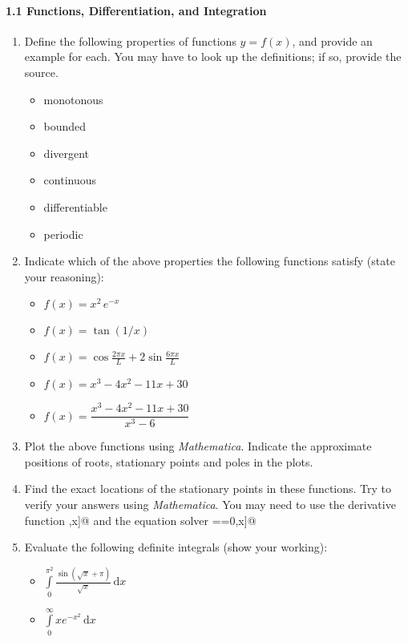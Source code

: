 \documentclass{chem6155problemset}
\begin{document}
\paragraph{1.1 Functions, Differentiation, and Integration}
\begin{enumerate}
 	\item Define the following properties of functions $y=f(x)$, and provide an example for each. You
	may have to look up the definitions; if so, provide the source.
	  \begin{itemize}
	  	\item monotonous
		\item bounded
		\item divergent
		\item continuous
		\item differentiable
		\item periodic
	  \end{itemize}
	  
	 \item Indicate which of the above properties the following functions satisfy (state
	 your reasoning):
	 	\begin{itemize}
			\item $f(x)=x^2\,e^{-x}$
			\item $f(x)=\tan(1/x)$
			\item $f(x)=\cos\frac{2\pi x}{L} + 2 \sin\frac{6\pi x}{L}$
			\item $f(x) = x^3-4x^2-11x+30$
			\item $f(x) = \dfrac{x^3-4x^2-11x+30}{x^3-6}$
		\end{itemize}
		
	\item Plot the above functions using \emph{Mathematica}. Indicate the approximate 
	positions of roots, stationary points and poles in the plots.
	
	\item Find the exact locations of the stationary points in these functions. 
	Try to verify your answers using \emph{Mathematica}. You may need to use
	the derivative function \verb@D[f[x],x]@ and the equation solver \verb@Solve[f[x]==0,x]@
	 
	 
	\item Evaluate the following definite integrals (show your working):
	 \begin{itemize}
	 	\item $\displaystyle\int\limits_0^{\pi^2} \frac{\sin(\sqrt{x}+\pi)}{\sqrt{x}}\,\mathrm{d}x$
		\item $\displaystyle\int\limits_0^\infty x e^{-x^2}\,\mathrm{d}x$
	 \end{itemize}
	 

\end{enumerate}
\end{document}
